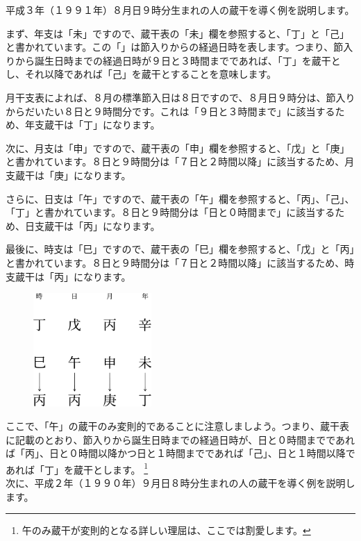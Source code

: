\documentclass[a5paper,11pt,dvipdfmx]{tarticle}
\begin{document}
平成３年（１９９１年）８月日９時分生まれの人の蔵干を導く例を説明します。

まず、年支は「未」ですので、蔵干表の「未」欄を参照すると、「丁」と「己」と書かれています。この「」は節入りからの経過日時を表します。つまり、節入りから誕生日時までの経過日時が９日と３時間までであれば、「丁」を蔵干とし、それ以降であれば「己」を蔵干とすることを意味します。

月干支表によれば、８月の標準節入日は８日ですので、８月日９時分は、節入りからだいたい８日と９時間分です。これは「９日と３時間まで」に該当するため、年支蔵干は「丁」になります。

次に、月支は「申」ですので、蔵干表の「申」欄を参照すると、「戊」と「庚」と書かれています。８日と９時間分は「７日と２時間以降」に該当するため、月支蔵干は「庚」になります。

さらに、日支は「午」ですので、蔵干表の「午」欄を参照すると、「丙」、「己」、「丁」と書かれています。８日と９時間分は「日と０時間まで」に該当するため、日支蔵干は「丙」になります。

最後に、時支は「巳」ですので、蔵干表の「巳」欄を参照すると、「戊」と「丙」と書かれています。８日と９時間分は「７日と２時間以降」に該当するため、時支蔵干は「丙」になります。

\begin{figure}[h]
  \includegraphics[width=45mm,angle=90]{figs/figure3-10.eps}
\end{figure}

ここで、「午」の蔵干のみ変則的であることに注意しましよう。つまり、蔵干表に記載のとおり、節入りから誕生日時までの経過日時が、日と０時間までであれば「丙」、日と０時間以降かつ日と１時間までであれば「己」、日と１時間以降であれば「丁」を蔵干とします。 \footnote{午のみ蔵干が変則的となる詳しい理屈は、ここでは割愛します。}\\

次に、平成２年（１９９０年）９月日８時分生まれの人の蔵干を導く例を説明します。
\end{document}

